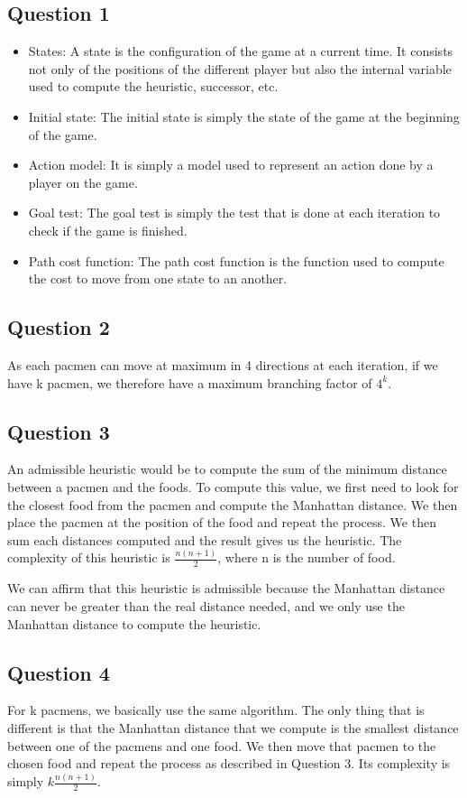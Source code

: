 \documentclass[a4paper,11pt]{article}
\begin{document}
	\subsection{Question 1}
		\begin{itemize}
			\item States: A state is the configuration of the game at a current time. It consists not only of the positions of the different player but also the internal variable used to compute the heuristic, successor, etc.
			\item Initial state: The initial state is simply the state of the game at the beginning of the game.
			\item Action model: It is simply a model used to represent an action done by a player on the game.
			\item Goal test: The goal test is simply the test that is done at each iteration to check if the game is finished.
			\item Path cost function: The path cost function is the function used to compute the cost to move from one state to an another.
		\end{itemize}
	\subsection{Question 2}
		\par As each pacmen can move at maximum in 4 directions at each iteration, if we have k pacmen, we therefore have a maximum branching factor of $4^k$.
	\subsection{Question 3}
		\par An admissible heuristic would be to compute the sum of the minimum distance between a pacmen and the foods. To compute this value, we first need to look for the closest food from the pacmen and compute the Manhattan distance. We then place the pacmen at the position of the food and repeat the process. We then sum each distances computed and the result gives us the heuristic. The complexity of this heuristic is $\frac{n(n+1)}{2}$, where n is the number of food.
		\par We can affirm that this heuristic is admissible because the Manhattan distance can never be greater than the real distance needed, and we only use the Manhattan distance to compute the heuristic.
	\subsection{Question 4}
		\par For k pacmens, we basically use the same algorithm. The only thing that is different is that the Manhattan distance that we compute is the smallest distance between one of the pacmens and one food. We then move that pacmen to the chosen food and repeat the process as described in Question 3. Its complexity is simply $k\frac{n(n+1)}{2}$.
\end{document}
